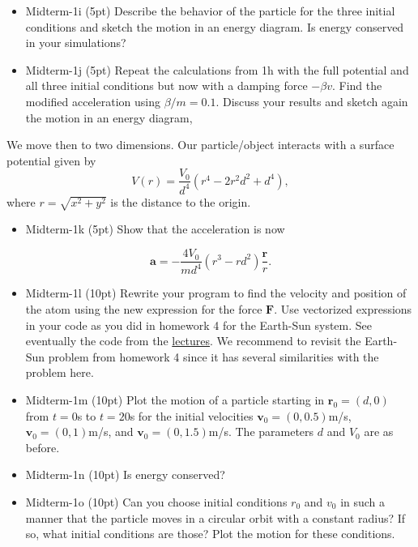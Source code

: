 \documentclass[%
oneside,                 %
final,                   %
10pt]{article}
\begin{document}
\begin{itemize}
\item Midterm-1i (5pt) Describe the behavior of the particle for the three initial conditions  and sketch the motion in an energy diagram. Is energy conserved in your simulations?

\item Midterm-1j (5pt) Repeat the calculations from 1h with the full potential and all three initial conditions but now with a damping force $-\beta v$. Find the modified acceleration using $\beta/m=0.1$. Discuss your results and sketch again the motion in an energy diagram,
\end{itemize}

\noindent
We move then to two dimensions. Our particle/object interacts with a surface potential given by
\[
V(r)=\frac{V_0}{d^4}\left(r^4-2r^2d^2+d^4\right),
\]
where $r=\sqrt{x^2+y^2}$ is the distance to the origin.

\begin{itemize}
\item Midterm-1k (5pt) Show that the acceleration is now
\end{itemize}

\noindent
\[
\bm{a}=-\frac{4V_0}{md^4}\left(r^3-rd^2\right)\frac{\bm{r}}{r}.
\]

\begin{itemize}
\item Midterm-1l (10pt) Rewrite your program to find the velocity and position of the atom using the new expression for the force $\bm{F}$. Use vectorized expressions in your code as you did in homework 4 for the Earth-Sun system. See eventually the code from the \href{{https://mhjensen.github.io/Physics321/doc/pub/energyconserv/html/energyconserv.html}}{lectures}.  We recommend to revisit the Earth-Sun problem from homework 4 since it has several similarities with the problem here.

\item Midterm-1m  (10pt) Plot the motion of a particle starting in $\bm{r}_0=(d,0)$ from $t=0$s to $t=20$s for the initial velocities $\bm{v}_0= (0,0.5)$m/s, $\bm{v}_0= (0,1)$m/s, and $\bm{v}_0= (0,1.5)$m/s. The parameters $d$ and $V_0$ are as before.

\item Midterm-1n (10pt) Is energy conserved? 

\item Midterm-1o  (10pt) Can you choose initial conditions $r_0$ and $v_0$ in such a manner that the particle moves in a circular orbit with a constant radius? If so, what initial conditions are those? Plot the motion for these conditions.
\end{itemize}

\noindent

\end{document}
